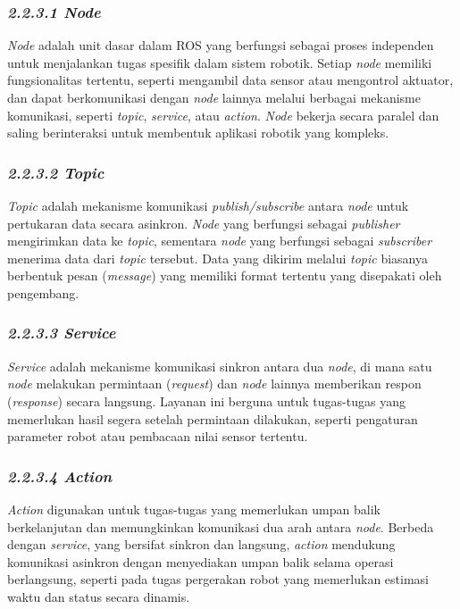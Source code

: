 \subsubsection{\emph{2.2.3.1 Node}}
\emph{Node} adalah unit dasar dalam ROS yang berfungsi sebagai proses independen untuk menjalankan tugas spesifik dalam sistem robotik. Setiap \emph{node} memiliki fungsionalitas tertentu, seperti mengambil data sensor atau mengontrol aktuator, dan dapat berkomunikasi dengan \emph{node} lainnya melalui berbagai mekanisme komunikasi, seperti \emph{topic}, \emph{service}, atau \emph{action}. \emph{Node} bekerja secara paralel dan saling berinteraksi untuk membentuk aplikasi robotik yang kompleks.

\subsubsection{\emph{2.2.3.2 Topic}}
\emph{Topic} adalah mekanisme komunikasi \emph{publish/subscribe} antara \emph{node} untuk pertukaran data secara asinkron. \emph{Node} yang berfungsi sebagai \emph{publisher} mengirimkan data ke \emph{topic}, sementara \emph{node} yang berfungsi sebagai \emph{subscriber} menerima data dari \emph{topic} tersebut. Data yang dikirim melalui \emph{topic} biasanya berbentuk pesan (\emph{message}) yang memiliki format tertentu yang disepakati oleh pengembang.

\subsubsection{\emph{2.2.3.3 Service}}
\emph{Service} adalah mekanisme komunikasi sinkron antara dua \emph{node}, di mana satu \emph{node} melakukan permintaan (\emph{request}) dan \emph{node} lainnya memberikan respon (\emph{response}) secara langsung. Layanan ini berguna untuk tugas-tugas yang memerlukan hasil segera setelah permintaan dilakukan, seperti pengaturan parameter robot atau pembacaan nilai sensor tertentu.

\subsubsection{\emph{2.2.3.4 Action}}
\emph{Action} digunakan untuk tugas-tugas yang memerlukan umpan balik berkelanjutan dan memungkinkan komunikasi dua arah antara \emph{node}. Berbeda dengan \emph{service}, yang bersifat sinkron dan langsung, \emph{action} mendukung komunikasi asinkron dengan menyediakan umpan balik selama operasi berlangsung, seperti pada tugas pergerakan robot yang memerlukan estimasi waktu dan status secara dinamis.

